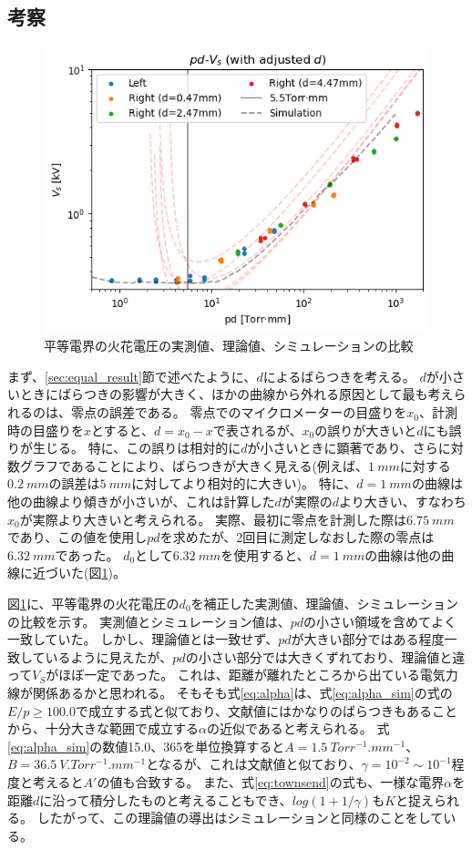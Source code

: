 \documentclass[a4paper]{ltjsarticle}
\begin{document}
\subsection{考察}
\begin{figure}[htbp]
    \centering
    \includegraphics[width=0.7\linewidth]{./images/equal_all.png}
    \caption{平等電界の火花電圧の実測値、理論値、シミュレーションの比較}
    \label{fig:equal_all}
\end{figure}
まず、\ref{sec:equal_result}節で述べたように、$d$によるばらつきを考える。
$d$が小さいときにばらつきの影響が大きく、ほかの曲線から外れる原因として最も考えられるのは、零点の誤差である。
零点でのマイクロメーターの目盛りを$x_0$、計測時の目盛りを$x$とすると、$d=x_0-x$で表されるが、$x_0$の誤りが大きいと$d$にも誤りが生じる。
特に、この誤りは相対的に$d$が小さいときに顕著であり、さらに対数グラフであることにより、ばらつきが大きく見える(例えば、$\SI{1}{mm}$に対する$\SI{0.2}{mm}$の誤差は$\SI{5}{mm}$に対してより相対的に大きい)。
特に、$d=\SI{1}{mm}$の曲線は他の曲線より傾きが小さいが、これは計算した$d$が実際の$d$より大きい、すなわち$x_0$が実際より大きいと考えられる。
実際、最初に零点を計測した際は$\SI{6.75}{mm}$であり、この値を使用し$pd$を求めたが、2回目に測定しなおした際の零点は$\SI{6.32}{mm}$であった。
$d_0$として$\SI{6.32}{mm}$を使用すると、$d=\SI{1}{mm}$の曲線は他の曲線に近づいた(図\ref{fig:equal_all})。

図\ref{fig:equal_all}に、平等電界の火花電圧の$d_0$を補正した実測値、理論値、シミュレーションの比較を示す。
実測値とシミュレーション値は、$pd$の小さい領域を含めてよく一致していた。
しかし、理論値とは一致せず、$pd$が大きい部分ではある程度一致しているように見えたが、$pd$の小さい部分では大きくずれており、理論値と違って$V_S$がほぼ一定であった。
これは、距離が離れたところから出ている電気力線が関係あるかと思われる。
そもそも式\ref{eq:alpha}は、式\ref{eq:alpha_sim}の式の$E/p\geq100.0$で成立する式と似ており、文献値にはかなりのばらつきもあることから、十分大きな範囲で成立する$\alpha$の近似であると考えられる。
式\ref{eq:alpha_sim}の数値15.0、365を単位換算すると$A=\SI{1.5}{Torr^{-1}.mm^{-1}}$、$B=\SI{36.5}{V.Torr^{-1}.mm^{-1}}$となるが、これは文献値と似ており、$\gamma=10^{-2}\sim10^{-1}$程度と考えると$A'$の値も合致する。
また、式\ref{eq:townsend}の式も、一様な電界$\alpha$を距離$d$に沿って積分したものと考えることもでき、$log(1+1/\gamma)$も$K$と捉えられる。
したがって、この理論値の導出はシミュレーションと同様のことをしている。
\end{document}
